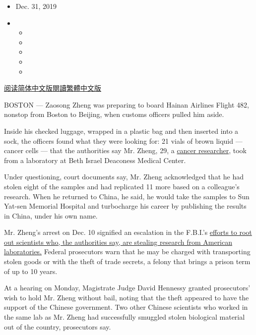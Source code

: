\begin{itemize}
\item
  Dec. 31, 2019
\item
  \begin{itemize}
  \item
  \item
  \item
  \item
  \item
  \end{itemize}
\end{itemize}

\href{https://cn.nytimes.com/usa/20200102/chinese-scientist-cancer-research-investigation/}{阅读简体中文版}\href{https://cn.nytimes.com/usa/20200102/chinese-scientist-cancer-research-investigation/zh-hant/}{閱讀繁體中文版}

BOSTON --- Zaosong Zheng was preparing to board Hainan Airlines Flight
482, nonstop from Boston to Beijing, when customs officers pulled him
aside.

Inside his checked luggage, wrapped in a plastic bag and then inserted
into a sock, the officers found what they were looking for: 21 vials of
brown liquid --- cancer cells --- that the authorities say Mr. Zheng,
29, a
\href{https://www.researchgate.net/scientific-contributions/2059782688_Zaosong_Zheng}{cancer
researcher}, took from a laboratory at Beth Israel Deaconess Medical
Center.

Under questioning, court documents say, Mr. Zheng acknowledged that he
had stolen eight of the samples and had replicated 11 more based on a
colleague's research. When he returned to China, he said, he would take
the samples to Sun Yat-sen Memorial Hospital and turbocharge his career
by publishing the results in China, under his own name.

Mr. Zheng's arrest on Dec. 10 signified an escalation in the F.B.I.'s
\href{https://www.nytimes.com/2019/11/04/health/china-nih-scientists.html}{efforts
to root out scientists who, the authorities say, are stealing research
from American laboratories.} Federal prosecutors warn that he may be
charged with transporting stolen goods or with the theft of trade
secrets, a felony that brings a prison term of up to 10 years.

At a hearing on Monday, Magistrate Judge David Hennessy granted
prosecutors' wish to hold Mr. Zheng without bail, noting that the theft
appeared to have the support of the Chinese government. Two other
Chinese scientists who worked in the same lab as Mr. Zheng had
successfully smuggled stolen biological material out of the country,
prosecutors say.

